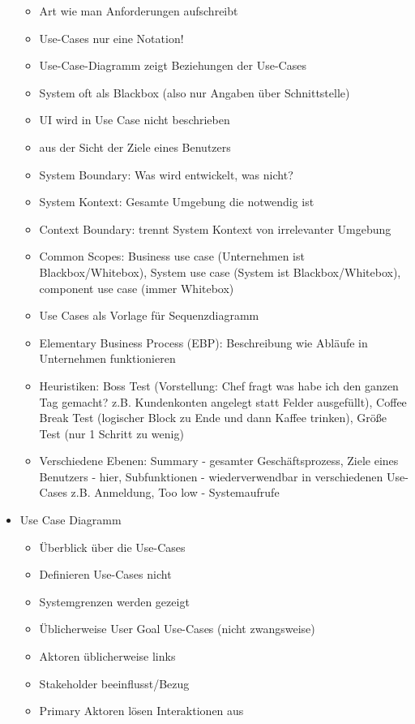 \documentclass[paper=a4, fontsize=11pt]{scrartcl} %
\numberwithin{equation}{section} %
\numberwithin{figure}{section} %
\numberwithin{table}{section} %
\begin{document}
\begin{itemize}
\begin{itemize}
    \item Art wie man Anforderungen aufschreibt
    \item Use-Cases nur eine Notation!
    \item Use-Case-Diagramm zeigt Beziehungen der Use-Cases
    \item System oft als Blackbox (also nur Angaben über Schnittstelle)
    \item UI wird in Use Case nicht beschrieben
    \item aus der Sicht der Ziele eines Benutzers
    \item System Boundary: Was wird entwickelt, was nicht?
    \item System Kontext: Gesamte Umgebung die notwendig ist
    \item Context Boundary: trennt System Kontext von irrelevanter Umgebung
    \item Common Scopes: Business use case (Unternehmen ist Blackbox/Whitebox), System use case (System ist Blackbox/Whitebox), component use case (immer Whitebox)
    \item Use Cases als Vorlage für Sequenzdiagramm
    \item Elementary Business Process (EBP): Beschreibung wie Abläufe in Unternehmen funktionieren
    \item Heuristiken: Boss Test (Vorstellung: Chef fragt was habe ich den ganzen Tag gemacht? z.B. Kundenkonten angelegt statt Felder ausgefüllt), Coffee Break Test (logischer Block zu Ende und dann Kaffee trinken), Größe Test (nur 1 Schritt zu wenig)
    \item Verschiedene Ebenen: Summary - gesamter Geschäftsprozess, Ziele eines Benutzers - hier, Subfunktionen - wiederverwendbar in verschiedenen Use-Cases z.B. Anmeldung, Too low - Systemaufrufe
  \end{itemize}
  \item Use Case Diagramm
  \begin{itemize}
    \item Überblick über die Use-Cases
    \item Definieren Use-Cases nicht
    \item Systemgrenzen werden gezeigt
    \item Üblicherweise User Goal Use-Cases (nicht zwangsweise)
    \item Aktoren üblicherweise links
    \item Stakeholder beeinflusst/Bezug
    \item Primary Aktoren lösen Interaktionen aus

\end{itemize}
\end{itemize}
\end{document}
